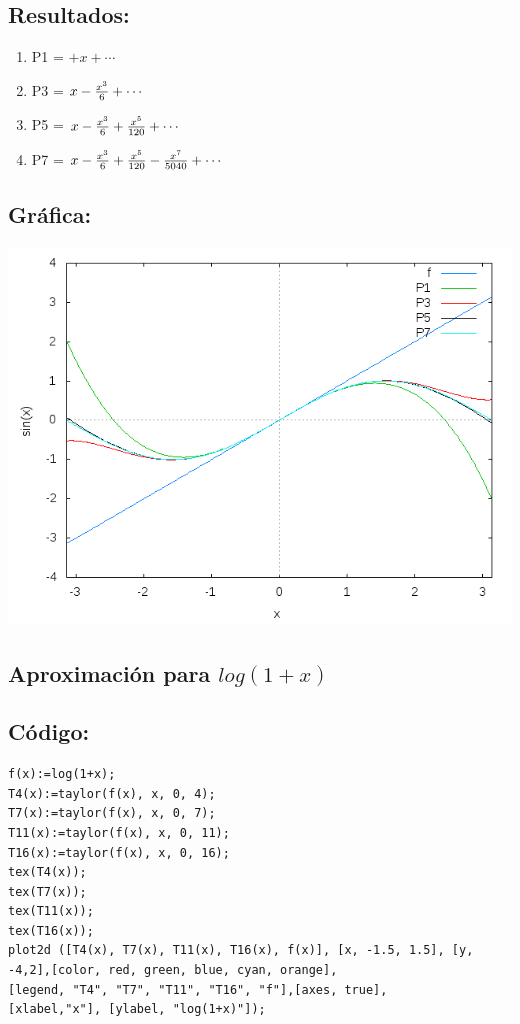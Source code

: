 \documentclass[10pt]{article}
\begin{document}
\subsection*{Resultados:}
\begin{enumerate}
\item P1 = $+x+\cdots $
\item P3 = $x-{{x^3}\over{6}}+\cdots $
\item P5 = $x-{{x^3}\over{6}}+{{x^5}\over{120}}+\cdots $
\item P7 = $x-{{x^3}\over{6}}+{{x^5}\over{120}}-{{x^7}\over{5040}}+\cdots $
\end{enumerate}
\subsection*{Gráfica:} 
\includegraphics[scale=0.6]{plot}

\newpage
\subsection{Aproximación para $log(1+x)$}
\subsection*{Código:}
\begin{verbatim}
f(x):=log(1+x);
T4(x):=taylor(f(x), x, 0, 4);
T7(x):=taylor(f(x), x, 0, 7);
T11(x):=taylor(f(x), x, 0, 11);
T16(x):=taylor(f(x), x, 0, 16);
tex(T4(x));
tex(T7(x));
tex(T11(x));
tex(T16(x));
plot2d ([T4(x), T7(x), T11(x), T16(x), f(x)], [x, -1.5, 1.5], [y, -4,2],[color, red, green, blue, cyan, orange],
[legend, "T4", "T7", "T11", "T16", "f"],[axes, true], 
[xlabel,"x"], [ylabel, "log(1+x)"]);
\end{verbatim}
\end{document}
